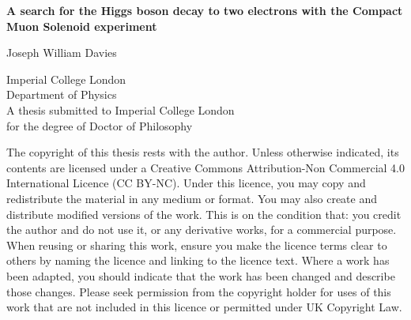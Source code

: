 \begin{titlepage}
    \begin{center}
        \vspace*{2cm}
        
        \huge{\textbf{A search for the Higgs boson decay to two electrons with the Compact Muon Solenoid experiment}}

        \vspace{1.5cm}
        \normalsize
        Joseph William Davies
        
        \vspace{0.5cm}
        Imperial College London\\
        Department of Physics\\

        \vspace{5cm}
        A thesis submitted to Imperial College London\\
        for the degree of Doctor of Philosophy\\
        
    \end{center}
\end{titlepage}

The copyright of this thesis rests with the author. Unless otherwise indicated, its contents are licensed under a Creative Commons Attribution-Non Commercial 4.0 International Licence (CC BY-NC). Under this licence, you may copy and redistribute the material in any medium or format. You may also create and distribute modified versions of the work. This is on the condition that: you credit the author and do not use it, or any derivative works, for a commercial purpose. When reusing or sharing this work, ensure you make the licence terms clear to others by naming the licence and linking to the licence text. Where a work has been adapted, you should indicate that the work has been changed and describe those changes. Please seek permission from the copyright holder for uses of this work that are not included in this licence or permitted under UK Copyright Law.
